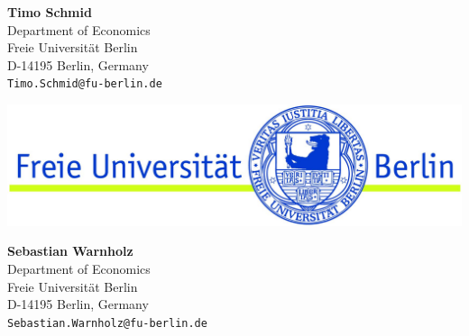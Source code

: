\documentclass[a0,portrait]{a0poster}\usepackage[]{graphicx}\usepackage[]{color}
\begin{document}
\vfill
\vspace{0.5cm}
\begin{minipage}[b]{0.3\linewidth}
  \Large\textbf{Timo Schmid}\\[0.5cm]
  \large 
  Department of Economics\\
  Freie Universit\"at Berlin\\
  D-14195 Berlin, Germany\\
  \texttt{Timo.Schmid@fu-berlin.de}
\end{minipage}
\hfill
\begin{minipage}[b]{0.3\linewidth}
\includegraphics[width=\linewidth]{FuBerlin}
\end{minipage}
\hfill
\begin{minipage}[b]{0.3\linewidth}
\begin{flushright}
  \Large\textbf{Sebastian Warnholz}\\[0.5cm]
  \large 
  Department of Economics\\
  Freie Universit\"at Berlin\\
  D-14195 Berlin, Germany\\
  \texttt{Sebastian.Warnholz@fu-berlin.de}
\end{flushright}
\end{minipage}
%

\end{document}
